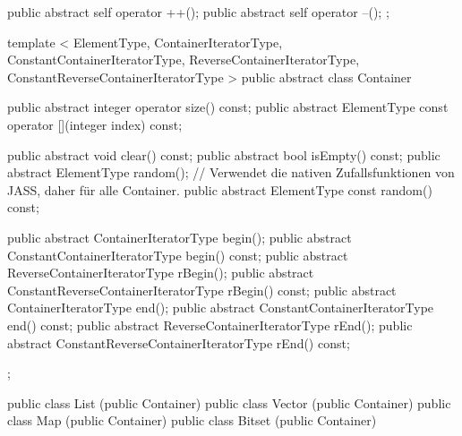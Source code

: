 {{{			public abstract self operator ++();
			public abstract self operator --();
		};

		template < ElementType, ContainerIteratorType, ConstantContainerIteratorType, ReverseContainerIteratorType, ConstantReverseContainerIteratorType >
		public abstract class Container
		{
			public abstract integer operator size() const;
			public abstract ElementType const operator [](integer index) const;

			public abstract void clear() const;
			public abstract bool isEmpty() const;
			public abstract ElementType random();
			// Verwendet die nativen Zufallsfunktionen von JASS, daher für alle Container.
			public abstract ElementType const random() const;

			public abstract ContainerIteratorType begin();
			public abstract ConstantContainerIteratorType begin() const;
			public abstract ReverseContainerIteratorType rBegin();
			public abstract ConstantReverseContainerIteratorType rBegin() const;
			public abstract ContainerIteratorType end();
			public abstract ConstantContainerIteratorType end() const;
			public abstract ReverseContainerIteratorType rEnd();
			public abstract ConstantReverseContainerIteratorType rEnd() const;
		};
	
		public class List (public Container)
		public class Vector (public Container)
		public class Map (public Container)
		public class Bitset (public Container)
	}
} 
